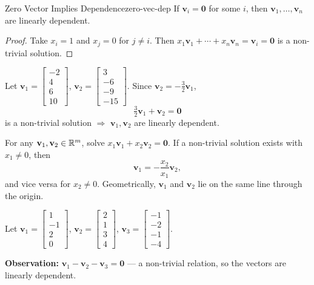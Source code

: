 \begin{theorem}{Zero Vector Implies Dependence}{zero-vec-dep}
  If $\mathbf{v}_i = \mathbf{0}$ for some $i$, then $\mathbf{v}_1, \ldots, \mathbf{v}_n$ are linearly dependent.
\end{theorem}

\begin{proof}
  Take $x_i = 1$ and $x_j = 0$ for $j \neq i$. Then
  $x_1 \mathbf{v}_1 + \cdots + x_n \mathbf{v}_n = \mathbf{v}_i = \mathbf{0}$
  is a non-trivial solution.
\end{proof}

\begin{example}
  Let $\mathbf{v}_1 =
    \begin{bmatrix}
      -2 \\ 4 \\ 6 \\ 10
    \end{bmatrix}
  $,
  $\mathbf{v}_2 =
    \begin{bmatrix}
      3 \\ -6 \\ -9 \\ -15
    \end{bmatrix}
  $.
  Since $\mathbf{v}_2 = -\tfrac{3}{2}\mathbf{v}_1$,
  \[
    \tfrac{3}{2}\mathbf{v}_1 + \mathbf{v}_2 = \mathbf{0}
  \]
  is a non-trivial solution $\Longrightarrow$ $\mathbf{v}_1, \mathbf{v}_2$ are linearly dependent.
\end{example}

\begin{example}
  For any $\mathbf{v}_1, \mathbf{v}_2 \in \mathbb{R}^m$, solve $x_1 \mathbf{v}_1 + x_2 \mathbf{v}_2 = \mathbf{0}$. If a non-trivial solution exists with $x_1 \neq 0$, then
  \[
    \mathbf{v}_1 = -\frac{x_2}{x_1} \mathbf{v}_2,
  \]
  and vice versa for $x_2 \neq 0$. Geometrically, $\mathbf{v}_1$ and $\mathbf{v}_2$ lie on the same line through the origin.
\end{example}

\begin{example}
  Let
  $\mathbf{v}_1 =
    \begin{bmatrix}
      1 \\ -1 \\ 2 \\ 0
    \end{bmatrix}
  $,
  $\mathbf{v}_2 =
    \begin{bmatrix}
      2 \\ 1 \\ 3 \\ 4
    \end{bmatrix}
  $,
  $\mathbf{v}_3 =
    \begin{bmatrix}
      -1 \\ -2 \\ -1 \\ -4
    \end{bmatrix}
  $.

  \textbf{Observation:} $\mathbf{v}_1 - \mathbf{v}_2 - \mathbf{v}_3 = \mathbf{0}$ --- a non-trivial relation, so the vectors are linearly dependent.
\end{example}

